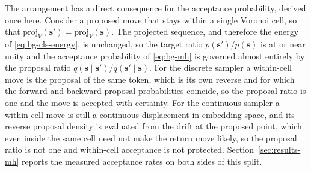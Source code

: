 
The arrangement has a direct consequence for the acceptance probability, derived once here. Consider a proposed move that stays within a single Voronoi cell, so that $\mathrm{proj}_V(\bm{s}') = \mathrm{proj}_V(\bm{s})$. The projected sequence, and therefore the energy of \eqref{eq:bg-cls-energy}, is unchanged, so the target ratio $p(\bm{s}')/p(\bm{s})$ is at or near unity and the acceptance probability of \eqref{eq:bg-mh} is governed almost entirely by the proposal ratio $q(\bm{s}\mid\bm{s}')/q(\bm{s}'\mid\bm{s})$. For the discrete sampler a within-cell move is the proposal of the same token, which is its own reverse and for which the forward and backward proposal probabilities coincide, so the proposal ratio is one and the move is accepted with certainty. For the continuous sampler a within-cell move is still a continuous displacement in embedding space, and its reverse proposal density is evaluated from the drift at the proposed point, which even inside the same cell need not make the return move likely, so the proposal ratio is not one and within-cell acceptance is not protected. Section~\ref{sec:results-mh} reports the measured acceptance rates on both sides of this split.

